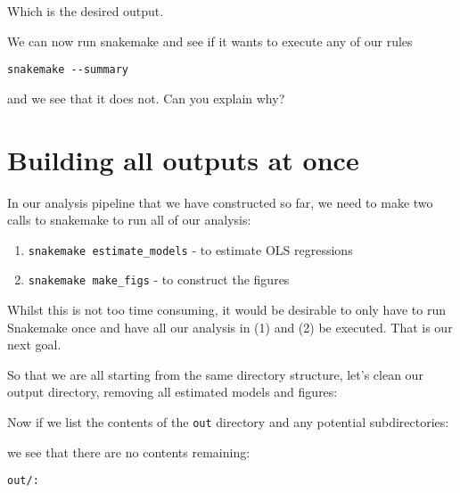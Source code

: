 \documentclass[]{book}
\newenvironment{Shaded}{\begin{snugshade}}{\end{snugshade}}
\newcommand{\KeywordTok}[1]{\textcolor[rgb]{0.13,0.29,0.53}{\textbf{{#1}}}}
\newcommand{\NormalTok}[1]{{#1}}
\providecommand{\tightlist}{%
  \setlength{\itemsep}{0pt}\setlength{\parskip}{0pt}}
\theoremstyle{definition}
\theoremstyle{definition}
\theoremstyle{definition}
\theoremstyle{remark}
\begin{document}
Which is the desired output.

We can now run snakemake and see if it wants to execute any of our rules

\begin{verbatim}
snakemake --summary
\end{verbatim}

and we see that it does not. Can you explain why?

\chapter{Building all outputs at
once}\label{building-all-outputs-at-once}

In our analysis pipeline that we have constructed so far, we need to
make two calls to snakemake to run all of our analysis:

\begin{enumerate}
\def\labelenumi{\arabic{enumi}.}
\tightlist
\item
  \texttt{snakemake\ estimate\_models} - to estimate OLS regressions
\item
  \texttt{snakemake\ make\_figs} - to construct the figures
\end{enumerate}

Whilst this is not too time consuming, it would be desirable to only
have to run Snakemake once and have all our analysis in (1) and (2) be
executed. That is our next goal.

So that we are all starting from the same directory structure, let's
clean our output directory, removing all estimated models and figures:

\begin{Shaded}
\end{Shaded}

Now if we list the contents of the \texttt{out} directory and any
potential subdirectories:

\begin{Shaded}
\end{Shaded}

we see that there are no contents remaining:

\begin{verbatim}
out/:
\end{verbatim}
\end{document}
